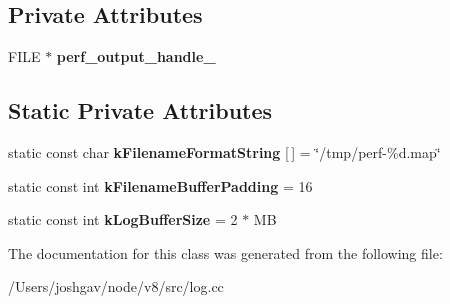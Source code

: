 \subsection*{Private Attributes}
\begin{DoxyCompactItemize}
\item 
F\+I\+LE $\ast$ {\bfseries perf\+\_\+output\+\_\+handle\+\_\+}\hypertarget{classv8_1_1internal_1_1_perf_basic_logger_a3a7ee6e27ddaa9cb6159fcd344a97a4f}{}\label{classv8_1_1internal_1_1_perf_basic_logger_a3a7ee6e27ddaa9cb6159fcd344a97a4f}

\end{DoxyCompactItemize}
\subsection*{Static Private Attributes}
\begin{DoxyCompactItemize}
\item 
static const char {\bfseries k\+Filename\+Format\+String} \mbox{[}$\,$\mbox{]} = \char`\"{}/tmp/perf-\/\%d.\+map\char`\"{}\hypertarget{classv8_1_1internal_1_1_perf_basic_logger_a3fbd65660a30f231f6b30c8f023708e1}{}\label{classv8_1_1internal_1_1_perf_basic_logger_a3fbd65660a30f231f6b30c8f023708e1}

\item 
static const int {\bfseries k\+Filename\+Buffer\+Padding} = 16\hypertarget{classv8_1_1internal_1_1_perf_basic_logger_afb95cfac67cef397a892b9faa9914358}{}\label{classv8_1_1internal_1_1_perf_basic_logger_afb95cfac67cef397a892b9faa9914358}

\item 
static const int {\bfseries k\+Log\+Buffer\+Size} = 2 $\ast$ MB\hypertarget{classv8_1_1internal_1_1_perf_basic_logger_a11885ae6e6a67b9fed4666b04b0738b5}{}\label{classv8_1_1internal_1_1_perf_basic_logger_a11885ae6e6a67b9fed4666b04b0738b5}

\end{DoxyCompactItemize}


The documentation for this class was generated from the following file\+:\begin{DoxyCompactItemize}
\item 
/\+Users/joshgav/node/v8/src/log.\+cc\end{DoxyCompactItemize}
